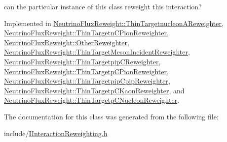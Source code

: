 can the particular instance of this class reweight this interaction? 



Implemented in \hyperlink{class_neutrino_flux_reweight_1_1_thin_targetnucleon_a_reweighter_ac412a741a29973bbefbb3daa0cf6636a}{Neutrino\-Flux\-Reweight\-::\-Thin\-Targetnucleon\-A\-Reweighter}, \hyperlink{class_neutrino_flux_reweight_1_1_thin_targetn_c_pion_reweighter_aaeb028c4bd75fcbbae6e03aba3a7e85a}{Neutrino\-Flux\-Reweight\-::\-Thin\-Targetn\-C\-Pion\-Reweighter}, \hyperlink{class_neutrino_flux_reweight_1_1_other_reweighter_af5cadc4dcde8b9884962399b0a29bc5a}{Neutrino\-Flux\-Reweight\-::\-Other\-Reweighter}, \hyperlink{class_neutrino_flux_reweight_1_1_thin_target_meson_incident_reweighter_ad6974a8bf1b26e86252ee2bc1e112c5a}{Neutrino\-Flux\-Reweight\-::\-Thin\-Target\-Meson\-Incident\-Reweighter}, \hyperlink{class_neutrino_flux_reweight_1_1_thin_targetpip_c_reweighter_a85dfb364850ec5af9b58cdff4c37c678}{Neutrino\-Flux\-Reweight\-::\-Thin\-Targetpip\-C\-Reweighter}, \hyperlink{class_neutrino_flux_reweight_1_1_thin_targetp_c_pion_reweighter_a09067dcacb294ca133e2660d61302e85}{Neutrino\-Flux\-Reweight\-::\-Thin\-Targetp\-C\-Pion\-Reweighter}, \hyperlink{class_neutrino_flux_reweight_1_1_thin_targetpip_cpip_reweighter_a0a7a18f342e8c88715671e3804dbd1ca}{Neutrino\-Flux\-Reweight\-::\-Thin\-Targetpip\-Cpip\-Reweighter}, \hyperlink{class_neutrino_flux_reweight_1_1_thin_targetp_c_kaon_reweighter_a78d9307c378b36d660feb54ba8114a9a}{Neutrino\-Flux\-Reweight\-::\-Thin\-Targetp\-C\-Kaon\-Reweighter}, and \hyperlink{class_neutrino_flux_reweight_1_1_thin_targetp_c_nucleon_reweighter_a974bafd329ce322beef237061f446694}{Neutrino\-Flux\-Reweight\-::\-Thin\-Targetp\-C\-Nucleon\-Reweighter}.



The documentation for this class was generated from the following file\-:\begin{DoxyCompactItemize}
\item 
include/\hyperlink{_i_interaction_reweighting_8h}{I\-Interaction\-Reweighting.\-h}\end{DoxyCompactItemize}
